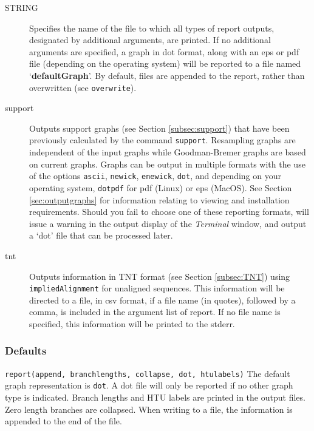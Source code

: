 \begin{description}
		\item [STRING] Specifies the name of the file to which all types of report 
		outputs, designated by additional arguments, are printed. If no additional 
		arguments are specified, a graph in dot format, along with an eps or pdf 
		file (depending on the operating system) will be reported to a file named 
		`\textbf{defaultGraph}'. By default, files are appended to the report, rather 
		than overwritten (see \texttt{overwrite}).
				
		\item[support] Outputs support graphs (see Section \ref{subsec:support})
		that have been previously calculated by the command \texttt{support}. 
		Resampling graphs \citep{Farrisetal1996} are independent of the input graphs 
		while Goodman-Bremer graphs \citep{Goodmanetal1982, bremer1994} are 
		based on current graphs. Graphs can be output in multiple formats with the
		use of the options \texttt{ascii}, \texttt{newick}, \texttt{enewick}, \texttt{dot}, 
		and depending on your operating system, \texttt{dotpdf} for pdf (Linux) or 
		eps (MacOS). See Section \ref{sec:outputgraphs} for information relating to 
		viewing and installation requirements. Should you fail to choose one of 
		these reporting formats, \phyg will issue a warning in the output display 
		of the \textit{Terminal} window, and output a `dot' file that can be processed 
		later.
		
		\item[tnt] Outputs information in TNT \citep{Goloboffetal2008} format (see 
		Section \ref{subsec:TNT}) using \texttt{impliedAlignment} for unaligned 
		sequences. This information will be directed to a file, in csv format, if a file 
		name (in quotes), followed by a comma, is included in the argument list of 
		report. If no file name is specified, this information will be printed to the stderr.
				 
	\end{description}			
		
	\subsubsection{Defaults}
		\texttt{report(append, branchlengths, collapse, dot, htulabels)}
		The default graph representation is \texttt{dot}. A dot file will only be 
		reported if no other graph type is indicated. Branch lengths and HTU 
		labels are printed in the output files. Zero length branches are collapsed. 
		When writing to a file, the information is appended to the end of the file. 
		
